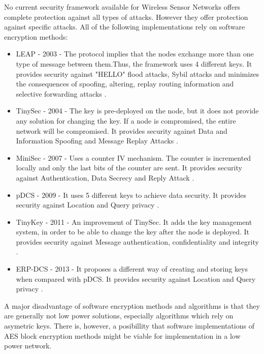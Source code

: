 No current security framework available for Wireless Sensor Networks offers complete protection
against all types of attacks. However they offer protection against specific attacks. All of the following implementations rely on 
software encryption methods:
\begin{itemize}

\item LEAP - 2003 - The protocol implies that the nodes exchange more than one type of message between them.Thus, the framework uses 4 different keys. It provides security against "HELLO" flood attacks, Sybil attacks and minimizes the consequences of spoofing, altering, replay routing information and selective forwarding attacks \cite{zhu2006leap+}.

\item TinySec - 2004 - The key is pre-deployed on the node, but it does not provide any solution for changing the key. If a node is compromised, the entire network will be compromised. It provides security against Data and Information Spoofing and Message Replay Attacks \cite{karlof2004tinysec}.
 
\item MiniSec - 2007 - Uses a counter IV mechanism. The counter is incremented locally and only the last bits of the counter are sent. It provides security against Authentication, Data Secrecy and Reply Attack \cite{luk2007minisec}.

\item pDCS - 2009 - It uses 5 different keys to achieve data security. It provides security against Location and Query privacy \cite{shao2009pdcs}.

\item TinyKey - 2011 - An improvement of TinySec. It adds the key management system, in order to be able to change the key after the node is deployed. It provides security against Message authentication, confidentiality and integrity \cite{doriguzzi2011tinykey}.

\item ERP-DCS - 2013 - It proposes a different way of creating and storing keys when compared with pDCS. It provides security against Location and Query privacy \cite{huang2013efficient}.

\end{itemize}

A major disadvantage of software encryption methods and algorithms is that they are generally not low 
power solutions, especially algorithms which rely on asymetric keys. There is, however, a posibillity 
that software implementations of AES block encryption methods might be viable for implementation in 
a low power network.

